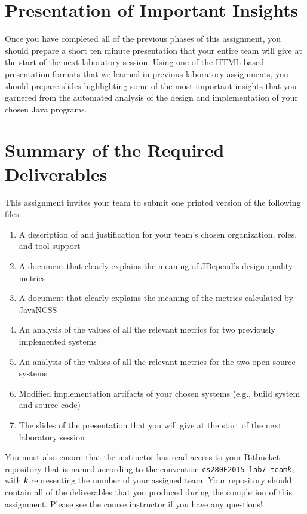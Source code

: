 \section*{Presentation of Important Insights}

Once you have completed all of the previous phases of this assignment, you should prepare a short ten minute
presentation that your entire team will give at the start of the next laboratory session. Using one of the HTML-based
presentation formats that we learned in previous laboratory assignments, you should prepare slides highlighting some of
the most important insights that you garnered from the automated analysis of the design and implementation of your
chosen Java programs.

\section*{Summary of the Required Deliverables}

This assignment invites your team to submit one printed version of the following files:
\vspace*{-.1in}
\begin{enumerate}
    \itemsep0em
    \item A description of and justification for your team's chosen organization, roles, and tool support
    \item A document that clearly explains the meaning of JDepend's design quality metrics
    \item A document that clearly explains the meaning of the metrics calculated by JavaNCSS
    \item An analysis of the values of all the relevant metrics for two previously implemented systems
    \item An analysis of the values of all the relevant metrics for the two open-source systems
    \item Modified implementation artifacts of your chosen systems (e.g., build system and source code)
    \item The slides of the presentation that you will give at the start of the next laboratory session
\end{enumerate}
\vspace*{-.1in}

You must also ensure that the instructor has read access to your Bitbucket repository that is named according to the
convention {\tt cs280F2015-lab7-team{\em k}}, with {\tt {\em k}} representing the number of your assigned team.  Your
repository should contain all of the deliverables that you produced during the completion of this assignment.  Please
see the course instructor if you have any questions!


